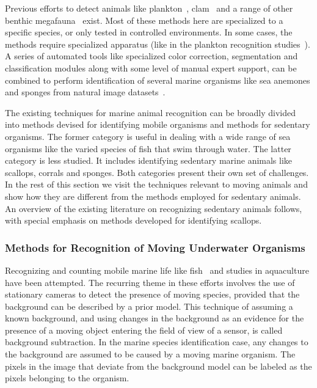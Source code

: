 \documentclass {udthesis}
\begin{document}
Previous efforts to detect animals like plankton~\cite{mcgavin_plankton, stelzer_rotifier}, clam~\cite{forrest_clam} and a range of other benthic megafauna~\cite{schoening} exist. Most of these methods here are specialized to a specific species, or only tested in controlled environments. In some cases, the methods require specialized apparatus (like in the plankton recognition studies~\cite{mcgavin_plankton, stelzer_rotifier}). 
A series of automated tools like specialized color correction, segmentation and classification modules along with some level of manual expert support, can be combined to perform identification of several marine organisms like sea anemones and sponges from natural image datasets~\cite{schoening}. 

The existing techniques for marine animal recognition can be broadly divided into methods devised for identifying mobile organisms and methods for sedentary organisms. The former category is useful in dealing with a wide range of sea organisms like the varied species of fish that swim through water. The latter category is less studied. It includes identifying sedentary marine animals like scallops, corrals and sponges. Both categories present their own set of challenges. In the rest of this section we visit the techniques relevant to moving animals and show how they are different from the methods employed for sedentary animals. An overview of the existing literature on recognizing sedentary animals follows, with special emphasis on methods developed for identifying scallops.


\subsubsection{Methods for Recognition of Moving Underwater Organisms}

Recognizing and counting mobile marine life like fish~\cite{spampinato, edgington, williams} and studies in aquaculture \cite{zion} have been attempted. The recurring theme in these efforts involves the use of stationary cameras to detect the presence of moving species, provided that the background can be described by a prior model. This technique of assuming a known background, and using changes in the background as an evidence for the presence of a moving object entering the field of view of a sensor, is called background subtraction. In the marine species identification case, any changes to the background are assumed to be caused by a moving marine organism. The pixels in the image that deviate from the background model can be labeled as the pixels belonging to the organism.
\end{document}

